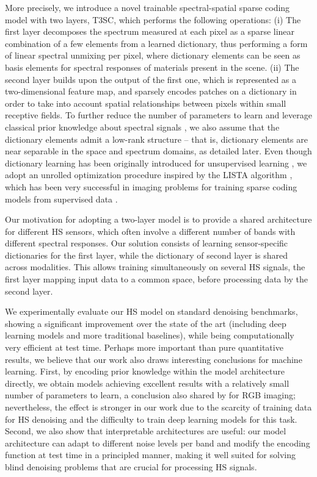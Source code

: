 More precisely, we introduce a novel trainable spectral-spatial sparse coding model with two layers, T3SC, which performs the following operations: (i) The first layer decomposes the spectrum measured at each pixel as a sparse linear combination of a few elements from a learned dictionary, thus performing a form of linear spectral unmixing per pixel, where dictionary elements can be seen as basis elements for spectral responses of materials present in the scene.
(ii) The second layer builds upon the output of the first one, which is represented as a two-dimensional feature map, and sparsely encodes patches on a dictionary in order to take into account spatial relationships between pixels within small receptive fields. 
To further reduce the number of parameters to learn and leverage classical prior knowledge about spectral signals \cite{wang_hyperspectral_2021}, we also assume that the dictionary
elements admit a low-rank structure -- that is, dictionary elements are near separable in the space and spectrum domains, as detailed later. 
Even though dictionary learning has been originally introduced for unsupervised learning \cite{mairal_sparse_2014, olshausen_emergence_1996}, we adopt an unrolled optimization procedure inspired by the LISTA algorithm \cite{gregor_learning_2010}, which has been very successful in imaging problems for training sparse coding models from supervised data \cite{lecouat_fully_2020, lecouat_flexible_2020, simon_rethinking_2019, xiong_smds-net_2020}.

Our motivation for adopting a two-layer model is to provide a shared architecture for different HS sensors, which often involve a different number of bands with different spectral responses. 
Our solution consists of learning sensor-specific dictionaries for the first layer, while the dictionary of second layer is shared across modalities. 
This allows training simultaneously on several HS signals, the first layer mapping input data to a common space, before processing data by the second layer.

We experimentally evaluate our HS model on standard denoising benchmarks, showing a significant
improvement over the state of the art (including deep learning models and more traditional baselines), while being computationally very efficient at test time. 
Perhaps more important than pure quantitative results, we believe that our work also draws interesting conclusions for machine learning. 
First, by encoding prior knowledge within the model architecture directly, we obtain models achieving excellent results with a relatively small number of parameters to learn, a conclusion also shared by \cite{lecouat_flexible_2020, lecouat_fully_2020} for RGB imaging; nevertheless, the effect is stronger in our work due to the scarcity of training data for HS denoising and the difficulty to train deep learning models for this task. 
Second, we also show that interpretable architectures are useful: our model architecture can adapt to different noise levels per band and modify the encoding function at test time in a principled manner, making it well suited for solving blind denoising problems that are crucial for processing HS signals.



